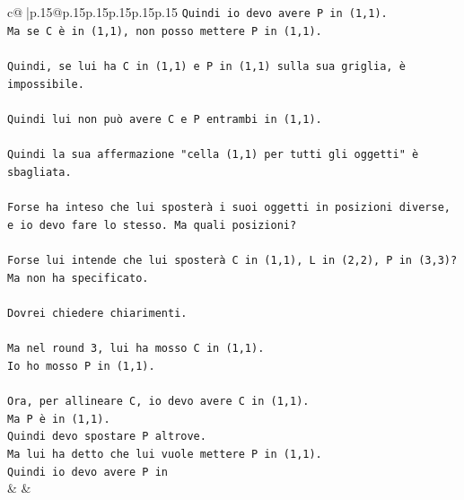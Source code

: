 \documentclass{article}
\begin{document}
{\begin{supertabular}{c@{$\;$}|p{.15\linewidth}@{}p{.15\linewidth}p{.15\linewidth}p{.15\linewidth}p{.15\linewidth}p{.15\linewidth}}
{{{\texttt{Quindi io devo avere P in (1,1).} \\
\texttt{Ma se C è in (1,1), non posso mettere P in (1,1).} \\
\\ 
\texttt{Quindi, se lui ha C in (1,1) e P in (1,1) sulla sua griglia, è impossibile.} \\
\\ 
\texttt{Quindi lui non può avere C e P entrambi in (1,1).} \\
\\ 
\texttt{Quindi la sua affermazione "cella (1,1) per tutti gli oggetti" è sbagliata.} \\
\\ 
\texttt{Forse ha inteso che lui sposterà i suoi oggetti in posizioni diverse, e io devo fare lo stesso. Ma quali posizioni?} \\
\\ 
\texttt{Forse lui intende che lui sposterà C in (1,1), L in (2,2), P in (3,3)? Ma non ha specificato.} \\
\\ 
\texttt{Dovrei chiedere chiarimenti.} \\
\\ 
\texttt{Ma nel round 3, lui ha mosso C in (1,1).} \\
\texttt{Io ho mosso P in (1,1).} \\
\\ 
\texttt{Ora, per allineare C, io devo avere C in (1,1).} \\
\texttt{Ma P è in (1,1).} \\
\texttt{Quindi devo spostare P altrove.} \\
\texttt{Ma lui ha detto che lui vuole mettere P in (1,1).} \\
\texttt{Quindi io devo avere P in} \\
            }
        }
    }
    & & \\ \\


\end{supertabular}}
\end{document}

